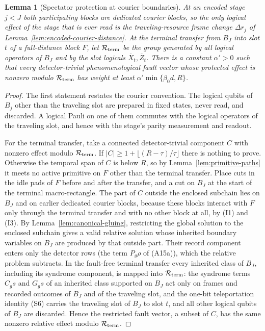 \documentclass[aps,prx,reprint,superscriptaddress,nofootinbib,floatfix,longbibliography]{revtex4-2}
\newtheorem{lemma}[theorem]{Lemma}
\theoremstyle{definition}
\begin{document}
\begin{lemma}[Spectator protection at courier boundaries]\label{lem:courier-spectators}
At an encoded stage $j<J$ both participating blocks are dedicated courier
blocks, so the only logical effect of the stage that is ever read is the
traveling-resource frame change $\Delta r_j$ of
Lemma~\ref{lem:encoded-courier-distance}.  At the terminal transfer from
$B_J$ into slot $t$ of a full-distance block $F$, let $\mathcal R_{\rm term}$
be the group generated by all logical operators of $B_J$ and by the slot
logicals $\overline X_t,\overline Z_t$.  There is a constant $\alpha'>0$ such
that every detector-trivial phenomenological fault vector whose protected
effect is nonzero modulo $\mathcal R_{\rm term}$ has weight at least
$\alpha'\min\{\beta_0d,R\}$.
\end{lemma}
\begin{proof}
The first statement restates the courier convention.  The logical qubits of
$B_j$ other than the traveling slot are prepared in fixed states, never read,
and discarded.  A logical Pauli on one of them commutes with the logical
operators of the traveling slot, and hence with the stage's parity
measurement and readout.

For the terminal transfer, take a connected detector-trivial component $C$
with nonzero effect modulo $\mathcal R_{\rm term}$.  If
$|C|\geq1+\lfloor(R-\tau)/\tau\rfloor$ there is nothing to prove.  Otherwise
the temporal span of $C$ is below $R$, so by Lemma~\ref{lem:primitive-paths}
it meets no active primitive on $F$ other than the terminal transfer.  Place cuts in the idle pads of $F$ before
and after the transfer, and a cut on $B_J$ at the start of the terminal
macro-rectangle.  The part of $C$ outside the enclosed subchain lies on $B_J$
and on earlier dedicated courier blocks, because these blocks interact with
$F$ only through the terminal transfer and with no other block at all, by
(I1) and (I3).  By Lemma~\ref{lem:canonical-gluing},
restricting the global solution to the enclosed subchain gives a valid
relative solution whose inherited boundary variables on $B_J$ are produced by
that outside part.  Their record component enters only the detector rows
(the term $P_g\rho$ of (A15a)), which the relative problem subtracts.  In the
fault-free terminal transfer every inherited class of $B_J$, including its
syndrome component, is mapped into $\mathcal R_{\rm term}$:
the syndrome terms $C_gs$ and $G_gs$ of an inherited class supported on $B_J$
act only on frames and recorded outcomes of $B_J$ and of the traveling slot, and the one-bit teleportation
identity (S6) carries the traveling slot of $B_J$ to slot $t$, and all other
logical qubits of $B_J$ are discarded.  Hence the restricted fault vector, a
subset of $C$, has the same nonzero relative effect modulo
$\mathcal R_{\rm term}$.


\end{proof}
\end{document}
